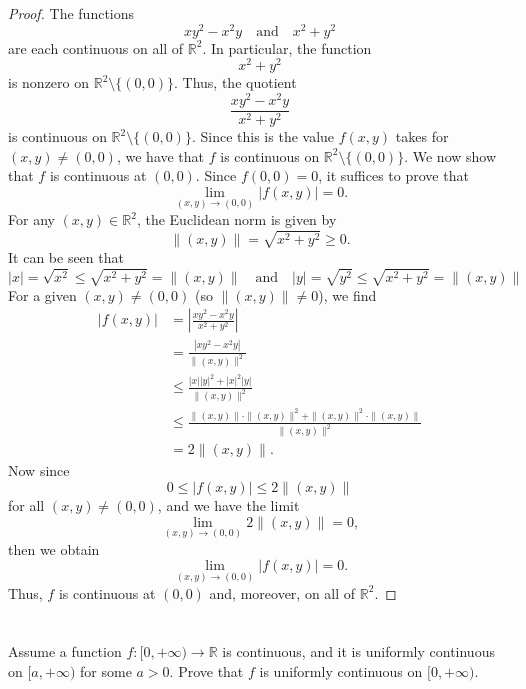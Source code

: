 \documentclass[12pt]{article}
\newenvironment{problem}
    {\begin{lrbox}{\mybox}\begin{minipage}{0.98\textwidth}}
    {\end{minipage}\end{lrbox}\framebox[\textwidth]{\usebox{\mybox}}}
\newcommand{\isp}[1]{\quad\text{#1}\quad}
\newcommand{\R}{\mathbb{R}}
\begin{document}
\begin{proof}
    The functions
    \[
        xy^2 - x^2y \isp{and} x^2 + y^2
    \]
    are each continuous on all of $\R^2$. In particular, the function
    \[
        x^2 + y^2
    \]
    is nonzero on $\R^2 \setminus \{(0, 0)\}$. Thus, the quotient
    \[
        \frac{xy^2 - x^2y}{x^2 + y^2}
    \]
    is continuous on $\R^2 \setminus \{(0, 0)\}$. Since this is the value $f(x, y)$ takes for $(x, y) \ne (0, 0)$, we have that $f$ is continuous on $\R^2 \setminus \{(0, 0)\}$. We now show that $f$ is continuous at $(0, 0)$. Since $f(0, 0) = 0$, it suffices to prove that
    \[
        \lim_{(x, y) \to (0, 0)} |f(x, y)| = 0.
    \]
    For any $(x, y) \in \R^2$, the Euclidean norm is given by
    \[
        \| (x, y) \| = \sqrt{x^2 + y^2} \geq 0.
    \]
    It can be seen that
    \[
        |x| = \sqrt{x^2} \leq \sqrt{x^2 + y^2} = \| (x, y) \| \isp{and} |y| = \sqrt{y^2} \leq \sqrt{x^2 + y^2} = \| (x, y) \|
    \]
    For a given $(x, y) \ne (0, 0)$ (so $\|(x,y)\| \ne 0$), we find
    \begin{align*}
        |f(x, y)|
            &=\left| \frac{xy^2 - x^2y}{x^2 + y^2} \right| \\[1em]
            &= \frac{|xy^2 - x^2y|}{\| (x, y) \|^2} \\[1em]
            &\leq \frac{|x||y|^2 + |x|^2|y|}{\| (x, y) \|^2} \\[1em]
            &\leq \frac{\| (x, y) \| \cdot \| (x, y) \|^2 + \| (x, y) \|^2 \cdot \| (x, y) \|}{\| (x, y) \|^2} \\[1em]
            &= 2\| (x, y) \|.
    \end{align*}
    Now since
    \[
        0 \leq |f(x, y)| \leq 2\| (x, y) \|
    \]
    for all $(x, y) \ne (0, 0)$, and we have the limit
    \[
        \lim_{(x, y) \to (0, 0)} 2\| (x, y) \| = 0,
    \]
    then we obtain
    \[
        \lim_{(x, y) \to (0, 0)} |f(x, y)| = 0.
    \]
    Thus, $f$ is continuous at $(0, 0)$ and, moreover, on all of $\R^2$.
    
    
\end{proof}

\newpage
\section{}
\begin{problem}
    Assume a function $f:[0,+\infty) \to \R$ is continuous, and it is uniformly continuous on $[a,+\infty)$ for some $a>0$. Prove that $f$ is uniformly continuous on $[0,+\infty)$.
\end{problem}
\end{document}
